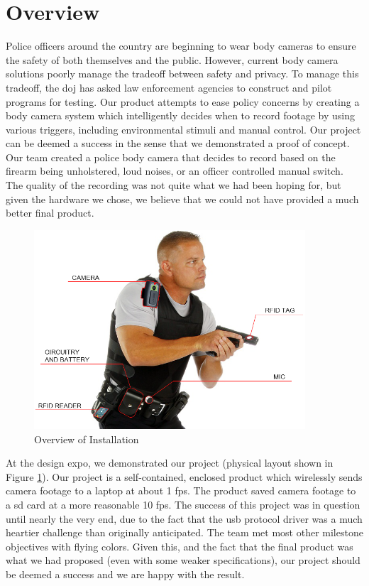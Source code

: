 \documentclass[12pt]{article}
\begin{document}
\setcounter{page}{1}

\section{Overview}
Police officers around the country are beginning to wear body cameras to ensure
the safety of both themselves and the public. However, current body camera
solutions poorly manage the tradeoff between safety and privacy. To manage this
tradeoff, the \gls{doj} has asked law enforcement agencies to construct and
pilot programs for testing\cite{officer_privacy}.  Our product attempts to ease
policy concerns by creating a body camera system which intelligently decides
when to record footage by using various triggers, including environmental
stimuli and manual control.  Our project can be deemed a success in the sense
that we demonstrated a proof of concept. Our team created a police body camera
that decides to record based on the firearm being unholstered, loud noises, or
an officer controlled manual switch.  The quality of the recording was not
quite what we had been hoping for, but given the hardware we chose, we believe
that we could not have provided a much better final product. 

\begin{figure}[h]
    \centering
    \includegraphics[width=0.9\textwidth]{installation}
    \caption{Overview of Installation}
    \label{fig:installation}
\end{figure}

At the design expo, we demonstrated our project (physical layout shown in
Figure \ref{fig:installation}).  Our project is a self-contained, enclosed
product which wirelessly sends camera footage to a laptop at about 1 \gls{fps}.
The product saved camera footage to a \gls{sd} card at a more reasonable 10
\gls{fps}.  The success of this project was in question until nearly the very
end, due to the fact that the \gls{usb} protocol driver was a much heartier
challenge than originally anticipated. The team met most other milestone
objectives with flying colors. Given this, and the fact that the final product
was what we had proposed (even with some weaker specifications), our project
should be deemed a success and we are happy with the result.
\end{document}
